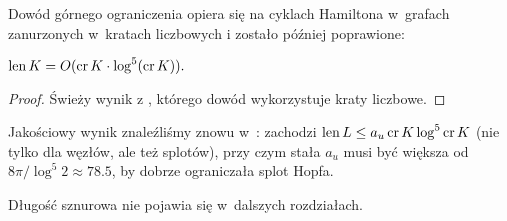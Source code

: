 Dowód górnego ograniczenia opiera się na cyklach Hamiltona w~grafach zanurzonych w~kratach liczbowych \cite{yu04} i zostało później poprawione:


\begin{proposition}
    $\operatorname{len} K = O(\operatorname{cr} K \cdot \log^5(\operatorname{cr} K)).$
\end{proposition}

\begin{proof}
    Świeży wynik z \cite{diao19}, którego dowód wykorzystuje kraty liczbowe.
\end{proof}

Jakościowy wynik znaleźliśmy znowu w~\cite{klotz21}: zachodzi $\operatorname{len} L \le a_u \operatorname{cr} K \log^5 \operatorname{cr} K$ (nie tylko dla węzłów, ale też splotów), przy czym stała $a_u$ musi być większa od $8\pi/\log^5 2 \approx 78.5$, by dobrze ograniczała splot Hopfa.

Długość sznurowa nie pojawia się w~dalszych rozdziałach.

%


